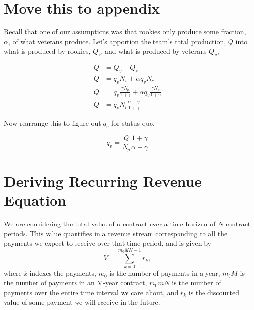 \documentclass[paper=a4, fontsize=11pt abstract]{scrartcl}
\numberwithin{equation}{section}		%
\numberwithin{figure}{section}			%
\numberwithin{table}{section}				%
\begin{document}
\section{Move this to appendix}
Recall that one of our assumptions was that rookies only produce some fraction, $\alpha$, of what veterans produce.  Let's apportion the team's total production, $Q$ into what is produced by rookies, $Q_r$, and what is produced by veterans $Q_v$,

\begin{align}
    Q &= Q_v + Q_r \\
    Q &= q_v N_v + \alpha q_v N_r \\ 
    Q &= q_v \frac{\gamma N_p}{1 + \gamma} + \alpha q_v \frac{\gamma N_p}{1 + \gamma} \\
    Q &= q_v N_p \frac{\alpha + \gamma}{1 + \gamma}
\end{align}

Now rearrange this to figure out $q_v$ for status-quo.

\begin{equation}
    q_v = \frac{Q}{N_p}\frac{1+ \gamma}{\alpha + \gamma}
\end{equation}




\section{Deriving Recurring Revenue Equation}
We are considering the total value of a contract over a time horizon of $N$ contract periods.  This value quantifies in a revenue stream corresponding to all the payments we expect to receive over that time period, and is given by
\begin{equation}
    V = \sum_{k=0}^{m_0 M N - 1} r_k,
\end{equation}
where $k$ indexes the payments,  $m_0$ is the number of payments in a year, $m_0 M$ is the number of payments in an M-year contract, $m_0 m N$ is the number of payments over the entire time interval we care about, and $r_k$ is the discounted value of some payment we will receive in the future.
\end{document}
